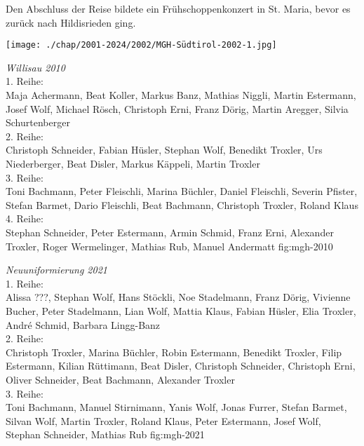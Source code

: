 \begin{history}
    Den Abschluss der Reise bildete ein Frühschoppenkonzert in St. Maria, bevor
    es zurück nach Hildisrieden ging.

    \begin{MulticolFigure}
        \centering
        \texttt{[image: ./chap/2001-2024/2002/MGH-Südtirol-2002-1.jpg]}
    \end{MulticolFigure}


\end{history}


{\emph{Willisau 2010}\\
    1. Reihe:\\
    Maja Achermann, Beat Koller, Markus Banz, Mathias Niggli, Martin Estermann,
    Josef Wolf, Michael Rösch, Christoph Erni, Franz Dörig, Martin Aregger,
    Silvia Schurtenberger\\
    2. Reihe:\\
    Christoph Schneider, Fabian Hüsler, Stephan Wolf, Benedikt Troxler, Urs
    Niederberger, Beat Disler, Markus Käppeli, Martin Troxler\\
    3. Reihe:\\
    Toni Bachmann, Peter Fleischli, Marina Büchler, Daniel Fleischli, Severin
    Pfister, Stefan Barmet, Dario Fleischli, Beat Bachmann, Christoph Troxler,
    Roland Klaus\\
    4. Reihe:\\
    Stephan Schneider, Peter Estermann, Armin Schmid, Franz Erni, Alexander
    Troxler, Roger Wermelinger, Mathias Rub, Manuel Andermatt } {fig:mgh-2010}


{\emph{Neuuniformierung 2021}\\
    1. Reihe:\\
    Alissa ???, Stephan Wolf, Hans Stöckli, Noe Stadelmann, Franz Dörig,
    Vivienne Bucher, Peter Stadelmann, Lian Wolf, Mattia Klaus, Fabian Hüsler,
    Elia Troxler, André Schmid, Barbara Lingg-Banz\\
    2. Reihe:\\
    Christoph Troxler, Marina Büchler, Robin Estermann, Benedikt Troxler, Filip
    Estermann, Kilian Rüttimann, Beat Disler, Christoph Schneider, Christoph
    Erni, Oliver Schneider, Beat Bachmann, Alexander Troxler\\
    3. Reihe:\\
    Toni Bachmann, Manuel Stirnimann, Yanis Wolf, Jonas Furrer, Stefan Barmet,
    Silvan Wolf, Martin Troxler, Roland Klaus, Peter Estermann, Josef Wolf,
    Stephan Schneider, Mathias Rub } {fig:mgh-2021}


